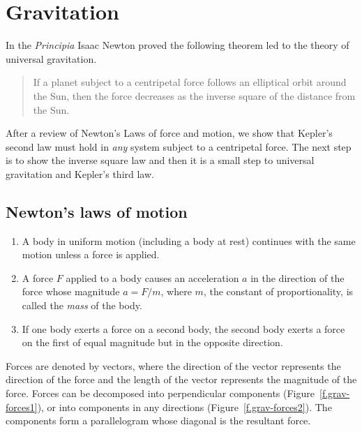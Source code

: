 

\section{Gravitation}\label{s.newton}

In the \textit{Principia} Isaac Newton proved the following theorem led to the theory of universal gravitation.
\begin{quote}
\begin{theorem}
If a planet subject to a centripetal force follows an elliptical orbit around the Sun, then the force decreases as the inverse square of the distance from the Sun.
\end{theorem}
\end{quote}
After a review of Newton's Laws of force and motion,  we show that Kepler's second law must hold in \emph{any} system subject to a centripetal force. The next step is to show the inverse square law and then it is a small step to universal gravitation and Kepler's third law.

\subsection{Newton's laws of motion}

\begin{enumerate}
\item A body in uniform motion (including a body at rest) continues with the same motion unless a force is applied.
\item A force $F$ applied to a body causes an acceleration $a$ in the direction of the force whose magnitude $a=F/m$, where $m$, the constant of proportionality, is called the \emph{mass} of the body.
\item If one body exerts a force on a second body, the second body exerts a force on the first of equal magnitude but in the opposite direction.
\end{enumerate}
Forces are denoted by vectors, where the direction of the vector represents the direction of the force and the length of the vector represents the magnitude of the force. Forces can be decomposed into perpendicular components (Figure~\ref{f.grav-forces1}), or into components in any directions (Figure~\ref{f.grav-forces2}). The components form a parallelogram whose diagonal is the resultant force.


